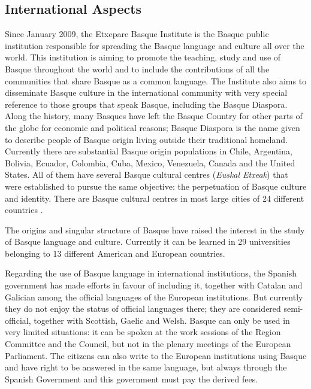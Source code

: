 \begin{multicols}{2}
\subsection{International Aspects}
    Since January 2009, the Etxepare Basque Institute is the Basque public institution responsible for spreading the Basque language and culture all over the world. This institution is aiming to promote the teaching, study and use of Basque throughout the world and to include the contributions of all the communities that share Basque as a common language. The Institute also aims to disseminate Basque culture in the international community with very special reference to those groups that speak Basque, including the Basque Diaspora. Along the history, many Basques have left the Basque Country for other parts of the globe for economic and political reasons; Basque Diaspora is the name given to describe people of Basque origin living outside their traditional homeland. Currently there are substantial Basque origin populations in Chile, Argentina, Bolivia, Ecuador, Colombia, Cuba, Mexico, Venezuela, Canada and the United States. All of them have several Basque cultural centres (\textit{Euskal Etxeak}) that were established to pursue the same objective: the perpetuation of Basque culture and identity. There are Basque cultural centres in most large cities of 24 different countries \cite{BAS-Nota14}. 

The origins and singular structure of Basque have raised the interest in the study of Basque language and culture. Currently it can be learned in 29 universities belonging to 13 different American and European countries.

Regarding the use of Basque language in international institutions, the Spanish government has made efforts in favour of including it, together with Catalan and Galician among the official languages of the European institutions. But currently they do not enjoy the status of official languages there; they are considered semi-official, together with Scottish, Gaelic and Welsh. Basque can only be used in very limited situations: it can be spoken at the work sessions of the Region Committee and the Council, but not in the plenary meetings of the European Parliament. The citizens can also write to the European institutions using Basque and have right to be answered in the same language, but always through the Spanish Government and this government must pay the derived fees.



\end{multicols}
